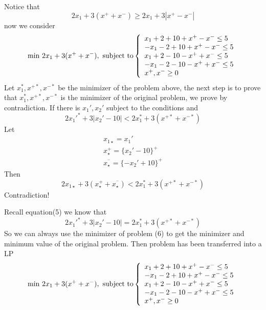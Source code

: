 \documentclass{article}
\begin{document}
Notice that 
\begin{equation}  
2x_1+3(x^++x^-) \geq 2x_1+3|x^+-x^-|
\end{equation}  
now we consider 
\begin{equation}  
\min \,2x_1+3(x^++x^-) , \textnormal{ subject to}
\left\{  
             \begin{array}{ll}
             x_1+2+10+x^+-x^-\leq 5\\
             -x_1-2+10+x^+-x^-\leq 5\\
             x_1+2-10-x^++x^-\leq 5\\
             -x_1-2-10-x^++x^-\leq 5\\
             x^+,x^-\geq 0
             \end{array}  
\right.  
\end{equation}  
Let $x_1^*,x^{+*},x^{-*}$ be the minimizer of the problem above, the next step is to prove that  $x_1^*,x^{+*},x^{-*}$ is the minimizer of the original problem, we prove by contradiction.
If there is $x_1',x_2'$ subject to the conditions and 
\begin{equation}  
2x_1'^*+3|x_2'-10| < 2x_1^*+3(x^{+*}+x^{-*})
\end{equation}  
Let 
\begin{eqnarray*}  
x_{1\star}=x_1'\\
x^{+}_\star=\{x_2'-10\}^+\\
x^{^-}_\star=\{-x_2'+10\}^+
\end{eqnarray*}  
Then 
\begin{equation}  
2x_{1\star}+3(x^{+}_\star+x^{^-}_\star) < 2x_1^*+3(x^{+*}+x^{-*})
\end{equation}  
Contradiction!

Recall equation(5) we know that
\begin{equation}  
2x_1'^*+3|x_2'-10| = 2x_1^*+3(x^{+*}+x^{-*})
\end{equation}  
So we can always use the minimizer of problem (6) to get the minimizer and minimum value of the original problem. Then problem has been transferred into a LP
\begin{equation}  
\min \,2x_1+3(x^++x^-) , \textnormal{ subject to}
\left\{  
             \begin{array}{ll}
             x_1+2+10+x^+-x^-\leq 5\\
             -x_1-2+10+x^+-x^-\leq 5\\
             x_1+2-10-x^++x^-\leq 5\\
             -x_1-2-10-x^++x^-\leq 5\\
             x^+,x^-\geq 0
             \end{array}  
\right.  
\end{equation}  
\end{document}
